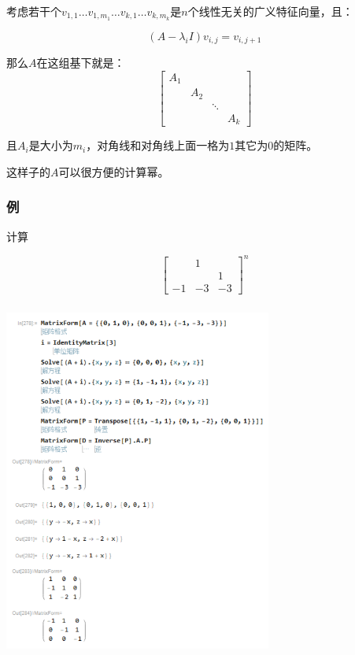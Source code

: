 \documentclass[10pt]{beamer}
\begin{document}
	\begin{frame}
		\frametitle{}
	
		考虑若干个$v_{1,1}\dots v_{1,m_1}\dots v_{k,1}\dots v_{k,m_k}$是$n$个线性无关的广义特征向量，且：
		
		$$
		(A-\lambda_i I)v_{i,j}=v_{i,j+1}
		$$

		那么$A$在这组基下就是：
		$$
		\begin{bmatrix}
			A_1\\
			&A_2\\
			&&\ddots\\
			&&&A_k
		\end{bmatrix}
		$$
		
		且$A_i$是大小为$m_i$，对角线和对角线上面一格为$1$其它为$0$的矩阵。

		这样子的$A$可以很方便的计算幂。
	\end{frame}
	\begin{frame}
		\frametitle{例}
	
		计算
		
		$$
		\begin{bmatrix}
			&1\\
			&&1\\
			-1&-3&-3
		\end{bmatrix}^n
		$$
	
	\end{frame}
	\begin{frame}
		\frametitle{}
	
		\begin{center}
			\includegraphics[width=0.66\textwidth]{3.PNG}
		\end{center}	
	
	\end{frame}
\end{document}
